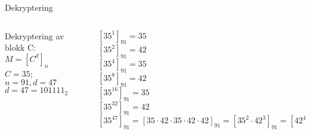 \begin{frame}{Dekryptering}
    \begin{columns}
        \begin{column}{0.45 \textwidth}
        Dekryptering av blokk C:\\
        $M=[C^d]_{n}$\\
        $C=35$; $n=91, d=47$\\
        $d=47=101111_2$\\
        \end{column}

        \begin{column}{0.45 \textwidth}
        $[35^1]_{91}=35$\\
        $[35^2]_{91}=42$\\
        $[35^4]_{91}=35$\\
        $[35^8]_{91}=42$\\
        $[35^{16}]_{91}=35$\\
        $[35^{32}]_{91}=42$\\
        $[35^{47}]_{91}=[35\cdot 42\cdot 35 \cdot 42 \cdot 42]_{91}=[35^2\cdot 42^3]_{91}=[42^4]_{91}=42$
        \end{column}
    \end{columns}
\end{frame}